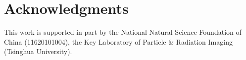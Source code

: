\section{Acknowledgments}
This work is supported in part by the National Natural Science Foundation of China (11620101004), the Key Laboratory of Particle \& Radiation Imaging (Tsinghua University). 
